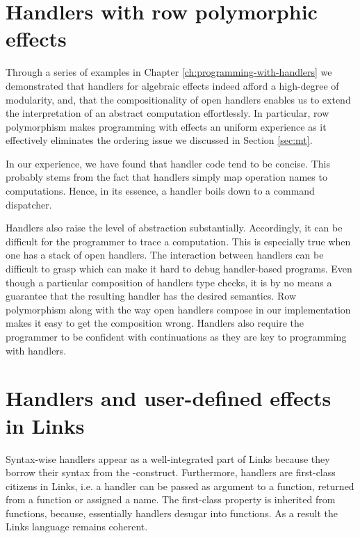 \section{Handlers with row polymorphic effects}\label{sec:eval-abs}
Through a series of examples in Chapter \ref{ch:programming-with-handlers} we demonstrated that handlers for algebraic effects indeed afford a high-degree of modularity, and, that the compositionality of open handlers enables us to extend the interpretation of an abstract computation effortlessly. In particular, row polymorphism makes programming with effects an uniform experience as it effectively eliminates the ordering issue we discussed in Section \ref{sec:mt}.

In our experience, we have found that handler code tend to be concise. This probably stems from the fact that handlers simply map operation names to computations. Hence, in its essence, a handler boils down to a command dispatcher.

Handlers also raise the level of abstraction substantially. Accordingly, it can be difficult for the programmer to trace a computation. This is especially true when one has a stack of open handlers. The interaction between handlers can be difficult to grasp which can make it hard to debug handler-based programs. Even though a particular composition of handlers type checks, it is by no means a guarantee that the resulting handler has the desired semantics. Row polymorphism along with the way open handlers compose in our implementation makes it easy to get the composition wrong. Handlers also require the programmer to be confident with continuations as they are key to programming with handlers. 

\section{Handlers and user-defined effects in Links}\label{sec:eval-integration}
Syntax-wise handlers appear as a well-integrated part of Links because they borrow their syntax from the -construct.
Furthermore, handlers are first-class citizens in Links, i.e. a handler can be passed as argument to a function, returned from a function or assigned a name. The first-class property is inherited from functions, because, essentially handlers desugar into functions.
As a result the Links language remains coherent.

